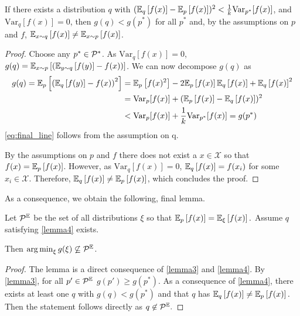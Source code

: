 \begin{lemma}\label{lemma4}
    If there exists a distribution $q$ with $(\EEX{q}{f(x)} - \EEX{p}{f(x)})^2 < \frac{1}{k} \mathrm{Var}_{p^*}[f(x)]$, and $\mathrm{Var}_{q}[f(x)] = 0$, then $g(q) < g(p^*)$ for all $p^*$ and, by the assumptions on $p$ and $f$, $\EEX{x\sim q}{f(x)} \neq \EEX{x \sim p}{f(x)}$.
\end{lemma}
\begin{proof}
    Choose any $p^*\in\P^*$. As $\mathrm{Var}_q[f(x)] = 0$, $g(q) = \EEX{x\sim p}{\left(\EEX{y\sim q}{f(y)} - f(x)\right)}$. We can now decompose $g(q)$ as 
    \begin{align}
        g(q) = \EEX{p}{\left(\EEX{q}{f(y)} - f(x)\right)^2} &= \EEX{p}{f(x)^2} - 2\EEX{p}{f(x)}\EEX{q}{f(x)} + \EEX{q}{f(x)}^2 \\
        & = \mathrm{Var}_p[f(x)] + (\EEX{p}{f(x)} - \EEX{q}{f(x)})^2 \\
        &< \mathrm{Var}_p[f(x)] + \frac{1}{k}\mathrm{Var}_{p^*}[f(x)] = g(p^*) \label{eq:final_line}
    \end{align}
    \autoref{eq:final_line} follows from the assumption on q.
    
    By the assumptions on $p$ and $f$ there does not exist a $x\in\mathcal{X}$ so that $f(x) = \EEX{p}{f(x)}$. However, as $\mathrm{Var}_q[f(x)] = 0$, $\EEX{q}{f(x)} = f(x_i)$ for some $x_i\in\mathcal{X}$. Therefore, $\EEX{q}{f(x)} \neq \EEX{p}{f(x)}$, which concludes the proof.
\end{proof}

As a consequence, we obtain the following, final lemma.

\begin{lemma}\label{lemma5}
    Let $\P^\mathbb{E}$ be the set of all distributions $\xi$ so that $\EEX{p}{f(x)} = \EEX{\xi}{f(x)}.$
    Assume $q$ satisfying \autoref{lemma4} exists.

    Then $\argmin_\xi g(\xi) \not \subseteq \P^\mathbb{E}$.
\end{lemma}

\begin{proof}
    The lemma is a direct consequence of \autoref{lemma3} and \autoref{lemma4}. 
    By \autoref{lemma3}, for all $p' \in \P^\mathbb{E}$ $g(p') \geq g(p^*)$. As a consequence of \autoref{lemma4}, there exists at least one $q$ with $g(q) < g(p^*)$ and that $q$ has $\EEX{q}{f(x)} \neq \EEX{p}{f(x)}.$ Then the statement follows directly as $q \not \in \P^\mathbb{E}.$
\end{proof}


